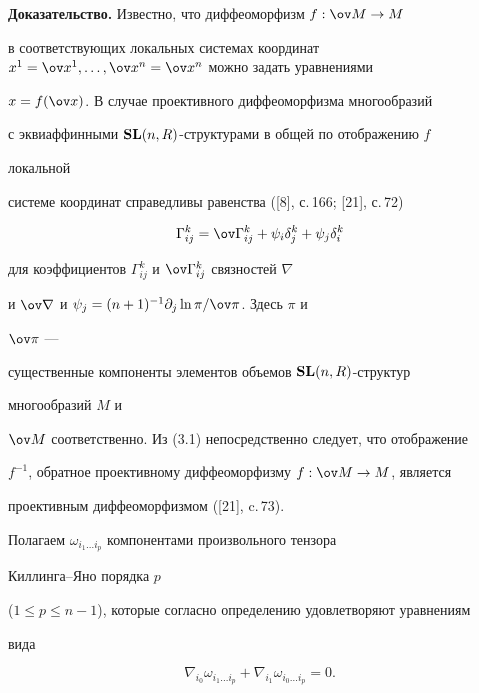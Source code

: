  


 


{\bf Доказательство.} Известно, что диффеоморфизм $f:\ov M\to M$ 


в соответствующих локальных системах координат $x^1=\ov x^1,\dotsc,\ov x^n=\ov 


x^n$ можно задать уравнениями


$x=f(\ov x)$. В случае проективного диффеоморфизма многообразий 


с эквиаффинными $\bold {SL}(n,R)$-структурами в общей по отображению $f$ 


локальной 


системе координат справедливы равенства ([8], с.\,166; [21], с.\,72) 


\begin{equation} 


\Gamma^k_{ij}=\ov\Gamma^k_{ij}+\psi_i\delta^k_j+ 


\psi_j\delta^k_i 


\end{equation} 


для коэффициентов $\Gamma^k_{ij}$ и $\ov\Gamma^k_{ij}$ связностей $\nabla$ 


и $\ov\nabla$ и $\psi_j=(n+1)^{-1}\partial_j\ln\pi/\ov\pi$. Здесь $\pi$ и 


$\ov\pi$ --- 


существенные компоненты элементов объемов $\bold {SL}(n,R)$-структур 


многообразий $M$ и 


$\ov M$ соответственно. Из (3.1) непосредственно следует, что отображение 


$f^{-1}$, обратное проективному диффеоморфизму $f:\ov M\to M$, является 


проективным диффеоморфизмом ([21], c.\,73). 


 


Полагаем $\omega_{i_1\dotsc i_p}$ компонентами произвольного тензора 


Киллинга--Яно порядка $p$ 


($1\le p\le n-1$), которые согласно определению удовлетворяют уравнениям 


вида 


\begin{equation} 


\nabla_{i_0}\omega_{i_1\dotsc i_p}+\nabla_{i_1} 


\omega_{i_0\dotsc i_p}=0. 


\end{equation} 


